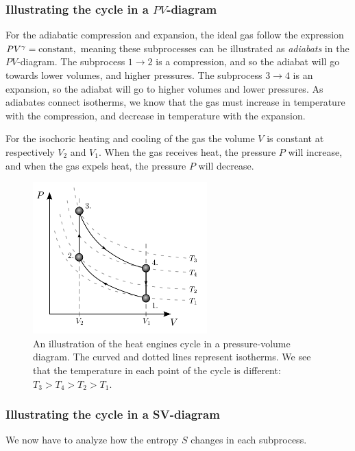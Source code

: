 \documentclass[a4paper, 11pt, titlepage, english]{article}
\begin{document}
\subsubsection*{Illustrating the cycle in a $PV$-diagram}
For the adiabatic compression and expansion, the ideal gas follow the expression
$PV^\gamma = {\rm constant},$
meaning these subprocesses can be illustrated as \emph{adiabats} in the $PV$-diagram. The subprocess $1\rightarrow 2$ is a compression, and so the adiabat will go towards lower volumes, and higher pressures. The subprocess $3\rightarrow 4$ is an expansion, so the adiabat will go to higher volumes and lower pressures. As adiabates connect isotherms, we know that the gas must increase in temperature with the compression, and decrease in temperature with the expansion.

For the isochoric heating and cooling of the gas the volume $V$ is constant at respectively $V_2$ and $V_1$. When the gas receives heat, the pressure $P$ will increase, and when the gas expels heat, the pressure $P$ will decrease.

\begin{figure}[htbp]
\centering
\includegraphics[width=0.6\textwidth]{PV}
\caption{An illustration of the heat engines cycle in a pressure-volume diagram. The curved and dotted lines represent isotherms. We see that the temperature in each point of the cycle is different: $T_3 > T_4 > T_2 > T_1.$ } \label{fig:PV}
\end{figure}

\clearpage


\subsubsection*{Illustrating the cycle in a SV-diagram}
We now have to analyze how the entropy $S$ changes in each subprocess. 
\end{document}
